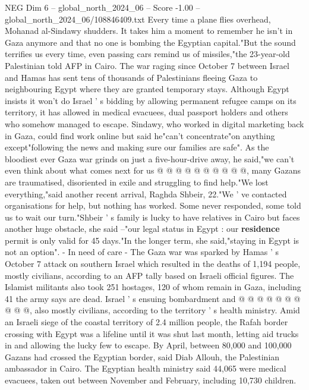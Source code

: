 \begin{textsample}{NEG Dim 6 – global\_north\_2024\_06 – Score -1.00 – global\_north\_2024\_06/108846409.txt}  \label{ex:f6_neg_310}
Every time a plane flies overhead, Mohanad al-Sindawy shudders.
It takes him a moment to remember he isn't in Gaza anymore and that no one is bombing the Egyptian capital."But the sound terrifies us every time, even passing cars remind us of missiles,"the 23-year-old Palestinian told AFP in Cairo.
The war raging since October 7 between Israel and Hamas has sent tens of thousands of Palestinians fleeing Gaza to neighbouring Egypt where they are granted temporary stays.
Although Egypt insists it won't do Israel ' s bidding by allowing permanent refugee camps on its territory, it has allowed in medical evacuees, dual passport holders and others who somehow managed to escape.
Sindawy, who worked in digital marketing back in Gaza, could find work online but said he"can't concentrate"on anything except"following the news and making sure our families are safe".
As the bloodiest ever Gaza war grinds on just a five-hour-drive away, he said,"we can't even think about what comes next for us @ @ @ @ @ @ @ @ @ @, many Gazans are traumatised, disoriented in exile and struggling to find help."We lost everything,"said another recent arrival, Raghda Shbeir, 22."We ' ve contacted organisations for help, but nothing has worked.
Some never responded, some told us to wait our turn."Shbeir ' s family is lucky to have relatives in Cairo but faces another huge obstacle, she said --"our legal status in Egypt : our \textbf{residence} permit is only valid for 45 days."In the longer term, she said,"staying in Egypt is not an option". - In need of care - The Gaza war was sparked by Hamas ' s October 7 attack on southern Israel which resulted in the deaths of 1,194 people, mostly civilians, according to an AFP tally based on Israeli official figures.
The Islamist militants also took 251 hostages, 120 of whom remain in Gaza, including 41 the army says are dead.
Israel ' s ensuing bombardment and @ @ @ @ @ @ @ @ @ @, also mostly civilians, according to the territory ' s health ministry.
Amid an Israeli siege of the coastal territory of 2.4 million people, the Rafah border crossing with Egypt was a lifeline until it was shut last month, letting aid trucks in and allowing the lucky few to escape.
By April, between 80,000 and 100,000 Gazans had crossed the Egyptian border, said Diab Allouh, the Palestinian ambassador in Cairo.
The Egyptian health ministry said 44,065 were medical evacuees, taken out between November and February, including 10,730 children.

\end{textsample}
